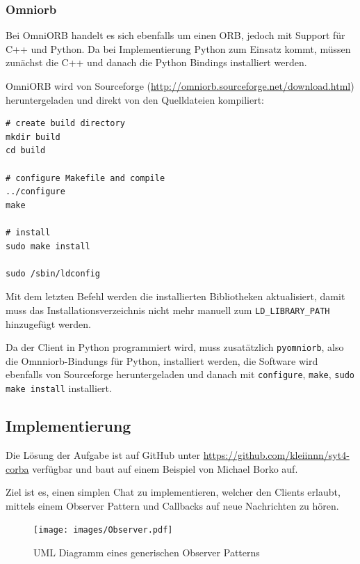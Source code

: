 \subsubsection{Omniorb}
Bei OmniORB handelt es sich ebenfalls um einen ORB, jedoch mit Support f\"ur C++ und Python.
Da bei Implementierung Python zum Einsatz kommt, m\"ussen zun\"achst die C++ und danach die Python Bindings installiert werden.

OmniORB wird von Sourceforge (\url{http://omniorb.sourceforge.net/download.html}) heruntergeladen und direkt von den Quelldateien kompiliert:
\begin{lstlisting}[caption=Installation von OmniORB]
# create build directory
mkdir build
cd build

# configure Makefile and compile
../configure
make

# install
sudo make install

sudo /sbin/ldconfig
\end{lstlisting}

Mit dem letzten Befehl werden die installierten Bibliotheken aktualisiert, damit muss das Installationsverzeichnis nicht mehr manuell zum \texttt{LD\_LIBRARY\_PATH} hinzugef\"ugt werden.

Da der Client in Python programmiert wird, muss zusat\"atzlich \texttt{pyomniorb}, also die Omnniorb-Bindungs f\"ur Python, installiert werden, die Software wird ebenfalls von Sourceforge heruntergeladen und danach mit \texttt{configure}, \texttt{make}, \texttt{sudo make install} installiert.

\subsection{Implementierung}
Die L\"osung der Aufgabe ist auf GitHub unter \url{https://github.com/kleiinnn/syt4-corba} verf\"ugbar und baut auf einem Beispiel von Michael Borko\cite{example} auf.

Ziel ist es, einen simplen Chat zu implementieren, welcher den Clients erlaubt, mittels einem Observer Pattern und Callbacks auf neue Nachrichten zu h\"oren.

\begin{figure}[H]
	\begin{center}
		\texttt{[image: images/Observer.pdf]}
		\caption{UML Diagramm eines generischen Observer Patterns\cite{observer-pattern}}
		\label{broker}
	\end{center}
\end{figure}

